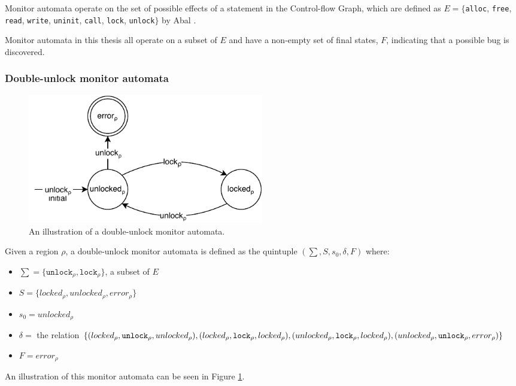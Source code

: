 \newpar Monitor automata operate on the set of possible effects of a statement in the Control-flow Graph, which are defined as $E = \{$\texttt{alloc}, \texttt{free}, \texttt{read}, \texttt{write}, \texttt{uninit}, \texttt{call}, \texttt{lock}, \texttt{unlock}$\}$ by Abal \cite{EffectiveBugFinding}. 

\newpar Monitor automata in this thesis all operate on a subset of $E$ and have a non-empty set of final states, $F$, indicating that a possible bug is discovered.  

\subsubsection{Double-unlock monitor automata}

\begin{figure}[H]
    \centering
    \includegraphics[width=0.5\textwidth]{background/figures/double-unlock}
    \caption{An illustration of a double-unlock monitor automata.}
    \label{double-unlock-automata}
\end{figure}

Given a region $\rho$, a double-unlock monitor automata is defined as the quintuple $(\sum, S, s_0, \delta, F)$ where: 

\begin{itemize}
    \item $\sum = \{\texttt{unlock}_\rho, \texttt{lock}_\rho\}$, a subset of $E$
    \item $S = \{ locked_\rho, unlocked_\rho, error_\rho \}$
    \item $s_0 = unlocked_\rho$ 
    \item $\delta =$ the relation $\{(locked_\rho, \texttt{unlock}_\rho, unlocked_\rho), (locked_\rho, \texttt{lock}_\rho, locked_\rho), \\
        (unlocked_\rho, \texttt{lock}_\rho, locked_\rho), (unlocked_\rho, \texttt{unlock}_\rho, error_\rho)\}$ 
    \item $F = error_\rho$  
\end{itemize}

An illustration of this monitor automata can be seen in Figure \ref{double-unlock-automata}. 

